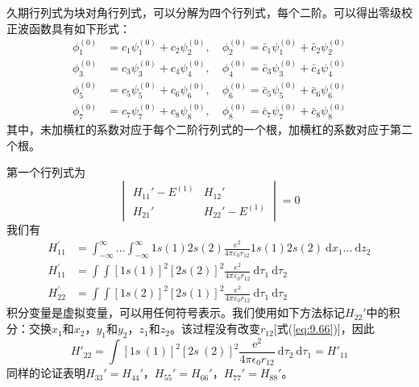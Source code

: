    久期行列式为块对角行列式，可以分解为四个行列式，每个二阶。可以得出零级校正波函数具有如下形式：
    \begin{equation}
        \begin{aligned}
            \phi_1^{\left(0\right)} &= c_1\psi_1^{\left(0\right)} + c_2\psi_2^{\left(0\right)}, \quad \phi_2^{\left(0\right)} = \bar{c}_1\psi_1^{\left(0\right)} + \bar{c}_2\psi_2^{\left(0\right)} \\
            \phi_3^{\left(0\right)} &= c_3\psi_3^{\left(0\right)} + c_4\psi_4^{\left(0\right)}, \quad \phi_4^{\left(0\right)} = \bar{c}_3\psi_3^{\left(0\right)} + \bar{c}_4\psi_4^{\left(0\right)} \\
            \phi_5^{\left(0\right)} &= c_5\psi_5^{\left(0\right)} + c_6\psi_6^{\left(0\right)}, \quad \phi_6^{\left(0\right)} = \bar{c}_5\psi_5^{\left(0\right)} + \bar{c}_6\psi_6^{\left(0\right)} \\
            \phi_7^{\left(0\right)} &= c_7\psi_7^{\left(0\right)} + c_8\psi_8^{\left(0\right)}, \quad \phi_8^{\left(0\right)} = \bar{c}_7\psi_7^{\left(0\right)} + \bar{c}_8\psi_8^{\left(0\right)}
        \end{aligned}
        \label{eq:9.94}
    \end{equation}
    其中，未加横杠的系数对应于每个二阶行列式的一个根，加横杠的系数对应于第二个根。

    第一个行列式为
    \begin{equation}
        \begin{vmatrix}
            H_{11}' - E^{\left(1\right)} & H_{12}' \\
            H_{21}' & H_{22}' - E^{\left(1\right)}
        \end{vmatrix} = 0
        \label{eq:9.95}
    \end{equation}
    我们有
    \begin{equation*}
        \begin{aligned}
            H_{11}^{\prime} & =\int_{-\infty}^{\infty} \ldots \int_{-\infty}^{\infty} 1 s(1) 2 s(2) \frac{e^{2}}{4 \pi \varepsilon_{0} r_{12}} 1 s(1) 2 s(2) \:\mathrm{d} x_{1} \ldots\: \mathrm{d} z_{2} \\
            H_{11}^{\prime} & =\int\int[1 s(1)]^{2}[2 s(2)]^{2} \frac{e^{2}}{4 \pi \varepsilon_{0} r_{12}} \:\mathrm{d} \tau_{1}\: \mathrm{d} \tau_{2} \\
            H_{22}^{\prime} & =\int\int[1 s(2)]^{2}[2 s(1)]^{2} \frac{e^{2}}{4 \pi \varepsilon_{0} r_{12}} \:\mathrm{d} \tau_{1} \:\mathrm{d} \tau_{2}
        \end{aligned}
    \end{equation*}
    积分变量是虚拟变量，可以用任何符号表示。我们使用如下方法标记$H_{22}'$中的积分：交换$x_1$和$x_2$，$y_1$和$y_2$，$z_1$和$z_2$。该过程没有改变$r_{12}$[式(\ref{eq:9.66})]，因此
    \begin{equation}
        H'_{22} = \int [1s\ (1)]^2 [2s\ (2)]^2 \frac{\mathrm{e}^2}{4\pi\epsilon_0 r_{12}}\: \mathrm{d}\tau_2\: \mathrm{d}\tau_1 = H'_{11}
        \label{eq:9.96}
    \end{equation}
    同样的论证表明$H_{33}' = H_{44}'$，$H_{55}' = H_{66}'$，$H_{77}' = H_{88}'$。


